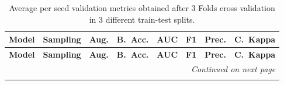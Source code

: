 \documentclass[a4paper,10pt]{book}
\begin{document}
\begin{scriptsize}
\begin{longtable}{@{}l l p{0.6cm} p{1.5cm} p{1.5cm} p{1.5cm} p{1.5cm} p{1.5cm}@{}}
\caption[Average validation metrics per seed]{Average per seed validation metrics obtained after 3 Folds cross validation in 3 different train-test splits.}
\label{tab:per_seed_metrics_avg}\\
\toprule
\textbf{Model} & \textbf{Sampling} & \textbf{Aug.} &
\textbf{B.\ Acc.} & \textbf{AUC} & \textbf{F1} &
\textbf{Prec.} & \textbf{C.\ Kappa} \\
\midrule
\endfirsthead

\toprule
\textbf{Model} & \textbf{Sampling} & \textbf{Aug.} &
\textbf{B.\ Acc.} & \textbf{AUC} & \textbf{F1} &
\textbf{Prec.} & \textbf{C.\ Kappa} \\
\midrule
\endhead

\midrule
\multicolumn{8}{r}{\textit{Continued on next page}}\\
\midrule
\endfoot


\end{longtable}
\end{scriptsize}
\end{document}
